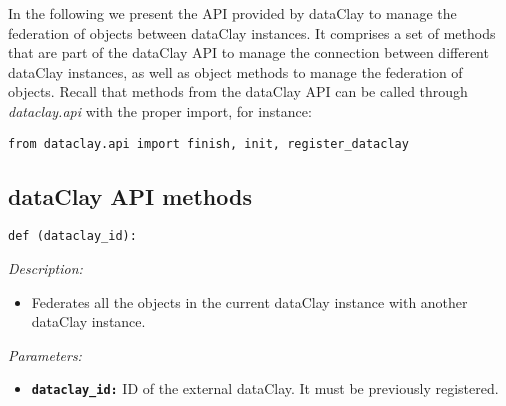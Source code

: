In the following we present the API provided by dataClay to manage the federation of objects between dataClay instances. It comprises a set of methods that are part of the dataClay API to manage the connection between different dataClay instances, as well as object methods to manage the federation of objects. Recall that methods from the dataClay API can be called through \textit{dataclay.api} with the proper import, for instance:

\colorbox{basecolor!20}{\texttt{from dataclay.api import finish, init, register\_dataclay}}

\subsection{dataClay API methods}
\label{sec:PythonFederationAPI}


\begin{dBox}
\texttt{def (dataclay\_id):}
\LINE

{\it Description:}

\begin{itemize}
  \item Federates all the objects in the current dataClay instance with another dataClay instance. 
\end{itemize}

{\it Parameters:}

\begin{itemize}
  \item \texttt{\bfseries dataclay\_id:} ID of the external dataClay. It must be previously registered.
\end{itemize}

\end{dBox}


